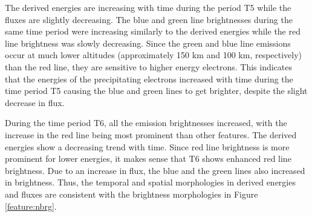 The derived energies are increasing with time during the period T5 while the fluxes are slightly decreasing. The blue and green line brightnesses during the same time period were increasing similarly to the derived energies while the red line brightness was slowly decreasing. Since the green and blue line emissions occur at much lower altitudes (approximately 150 km and 100 km, respectively) than the red line, they are sensitive to higher energy electrons. This indicates that the energies of the precipitating electrons increased with time during the time period T5 causing the blue and green lines to get brighter, despite the slight decrease in flux.

During the time period T6, all the emission brightnesses increased, with the increase in the red line being most prominent than other features. The derived energies show a decreasing trend with time. Since red line brightness is more prominent for lower energies, it makes sense that T6 shows enhanced red line brightness. Due to an increase in flux, the blue and the green lines also increased in brightness. Thus, the temporal and spatial morphologies in derived energies and fluxes are consistent with the brightness morphologies in Figure \ref{feature:nbrg}. 










